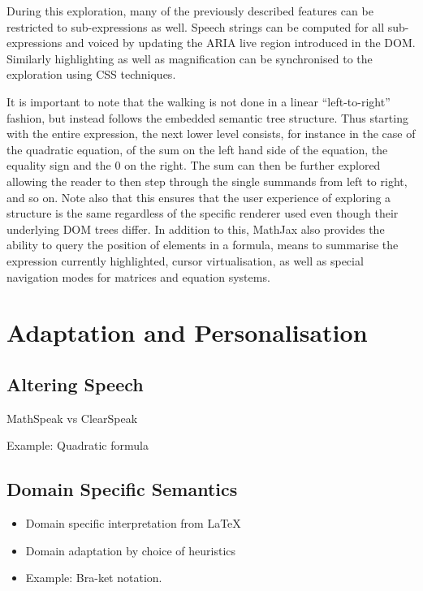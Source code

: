 \documentclass{sig-alternate}
\begin{document}
During this exploration, many of the previously described features can be
restricted to sub-expressions as well. Speech strings can be
computed for all sub-expressions and voiced by updating the ARIA live region
introduced in the DOM. Similarly highlighting as well as magnification can be
synchronised to the exploration using CSS techniques.

It is important to note that the walking is not done in a linear
``left-to-right'' fashion, but instead follows the embedded semantic tree
structure. Thus starting with the entire expression, the next lower level
consists, for instance in the case of the quadratic equation, of the sum on the
left hand side of the equation, the equality sign and the $0$ on the right.  The
sum can then be further explored allowing the reader to then step through the
single summands from left to right, and so on.  Note also that this
ensures that the user experience of exploring a structure is the same regardless
of the specific renderer used even though their underlying DOM trees differ.
In addition to this, MathJax also provides the ability to
query the position of elements in a formula, means to summarise the expression currently
highlighted, cursor virtualisation, as well as special navigation modes for
matrices and equation systems.


\section{Adaptation and Personalisation}
\label{sec:challenges}

\subsection{Altering Speech}

MathSpeak vs ClearSpeak

Example: Quadratic formula

\subsection{Domain Specific Semantics}

\begin{itemize}
\item Domain specific interpretation from {\LaTeX}
\item Domain adaptation by choice of heuristics
\item Example: Bra-ket notation.
\end{itemize}
\end{document}
